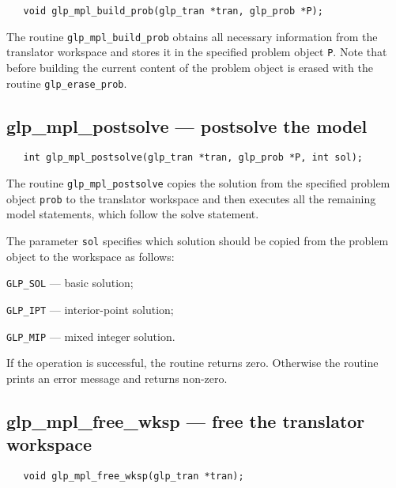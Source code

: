 \begin{verbatim}
   void glp_mpl_build_prob(glp_tran *tran, glp_prob *P);
\end{verbatim}

\description

The routine \verb|glp_mpl_build_prob| obtains all necessary information
from the translator work\-space and stores it in the specified problem
object \verb|P|. Note that before building the current content of the
problem object is erased with the routine \verb|glp_erase_prob|.

\newpage

\subsection{glp\_mpl\_postsolve --- postsolve the model}

\synopsis

\begin{verbatim}
   int glp_mpl_postsolve(glp_tran *tran, glp_prob *P, int sol);
\end{verbatim}

\description

The routine \verb|glp_mpl_postsolve| copies the solution from the
specified problem object \verb|prob| to the translator workspace and
then executes all the remaining model statements, which follow the
solve statement.

The parameter \verb|sol| specifies which solution should be copied
from the problem object to the workspace as follows:

\verb|GLP_SOL| --- basic solution;

\verb|GLP_IPT| --- interior-point solution;

\verb|GLP_MIP| --- mixed integer solution.

\returns

If the operation is successful, the routine returns zero. Otherwise
the routine prints an error message and returns non-zero.

\subsection{glp\_mpl\_free\_wksp --- free the translator workspace}

\synopsis

\begin{verbatim}
   void glp_mpl_free_wksp(glp_tran *tran);
\end{verbatim}

